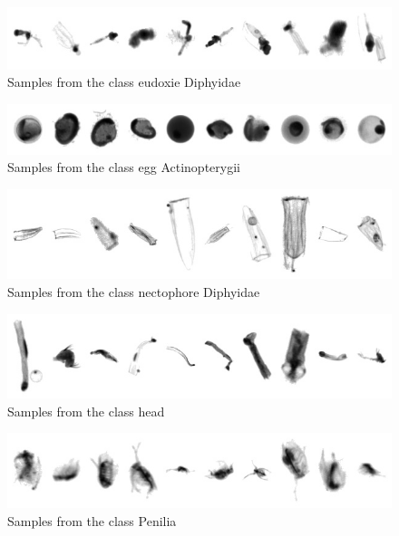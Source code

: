 \begin{figure}[h]
\includegraphics[width=\columnwidth]{collage/050_eudoxie__Diphyidae.jpg}\caption{Samples from the class eudoxie  Diphyidae }
\end{figure}
\begin{figure}[h]
\includegraphics[width=\columnwidth]{collage/051_egg__Actinopterygii.jpg}\caption{Samples from the class egg  Actinopterygii }
\end{figure}
\begin{figure}[h]
\includegraphics[width=\columnwidth]{collage/052_nectophore__Diphyidae.jpg}\caption{Samples from the class nectophore  Diphyidae }
\end{figure}
\begin{figure}[h]
\includegraphics[width=\columnwidth]{collage/053_head.jpg}\caption{Samples from the class head }
\end{figure}
\begin{figure}[h]
\includegraphics[width=\columnwidth]{collage/054_Penilia.jpg}\caption{Samples from the class Penilia }
\end{figure}
